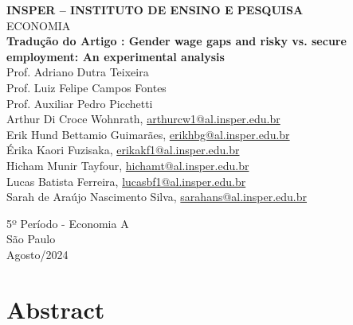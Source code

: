 \documentclass[a4paper,12pt]{article}[abntex2]
\begin{document}
\begin{titlepage}
    \centering
    \vspace*{1cm}
    \Large\textbf{INSPER – INSTITUTO DE ENSINO E PESQUISA}\\
    \Large ECONOMIA\\
    \vspace{1.5cm}
    \Large\textbf{Tradução do Artigo : Gender wage gaps and risky vs. secure employment: An experimental analysis}\\
    \vspace{1.5cm}
    Prof. Adriano Dutra Teixeira\\
    Prof. Luiz Felipe Campos Fontes\\
    Prof. Auxiliar Pedro Picchetti\\
    \vfill
    \normalsize
    Arthur Di Croce Wohnrath, \href{mailto:arthurcw1@al.insper.edu.br}{arthurcw1@al.insper.edu.br}\\
Erik Hund Bettamio Guimarães, \href{mailto:erikhbg@al.insper.edu.br}{erikhbg@al.insper.edu.br}\\
Érika Kaori Fuzisaka, \href{mailto:erikakf1@al.insper.edu.br}{erikakf1@al.insper.edu.br}\\
Hicham Munir Tayfour, \href{mailto:hichamt@al.insper.edu.br}{hichamt@al.insper.edu.br}\\
Lucas Batista Ferreira, \href{mailto:lucasbf1@al.insper.edu.br}{lucasbf1@al.insper.edu.br}\\
Sarah de Araújo Nascimento Silva, \href{mailto:sarahans@al.insper.edu.br}{sarahans@al.insper.edu.br}

    5º Período - Economia A\\
    \vfill
    São Paulo\\
    Agosto/2024
\end{titlepage}

\newpage
\tableofcontents
\thispagestyle{empty} %
\newpage
\setcounter{page}{1} %
\justify
\onehalfspacing

\pagestyle{fancy}
\fancyhf{}
\rhead{\thepage}

\section*{\textbf{Abstract}}
\end{document}
